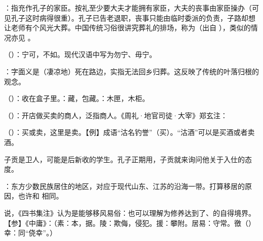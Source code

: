 {
\item {}：指充作孔子的家臣。按礼至少要大夫才能拥有家臣，大夫的丧事由家臣操办（可见孔子这时病得很重）。孔子已告老退职，丧事只能由临时委派的负责，子路却想让老师有个风光大葬。中国传统习俗很讲究葬礼的排场，称为（出自 ），类似的情况亦见  。
\item {}（）：宁可，不如。现代汉语中写为勿宁、毋宁。

\item {}：字面义是（凄凉地）死在路边，实指无法回乡归葬。这反映了传统的叶落归根的观念。
}
{}


{
\begin{lyitemize}
\item {}（）：收在盒子里。：藏，包藏。：木匣，木柜。
\item {}（）：开店做买卖的商人，泛指商人。《周礼·地官司徒·大宰》郑玄注：
\item {}（）：买或卖，这里是卖。【例】成语“沽名钓誉”（买）。“沽酒”可以是买酒或者卖酒。
\end{lyitemize}
子贡是卫人，可能是后新收的学生。孔子正期用，子贡就来询问他关于入仕的态度。
}
{}


{
\item {}：东方少数民族居住的地区，对应于现代山东、江苏的沿海一带。打算移居的原因，也许和  相同。
\item {}说，《四书集注》认为是能够移风易俗：也可以理解为修养达到了、的自得境界。【参】《中庸》：（素：本，据。陵：欺侮，侵犯。援：攀附。居易：守常。徼（）幸：同“侥幸”。）
}
{}


